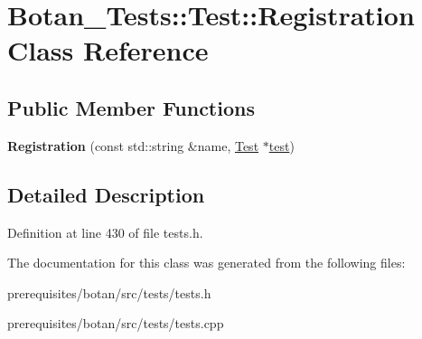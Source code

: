 \hypertarget{class_botan___tests_1_1_test_1_1_registration}{}\section{Botan\+\_\+\+Tests\+:\+:Test\+:\+:Registration Class Reference}
\label{class_botan___tests_1_1_test_1_1_registration}
\subsection*{Public Member Functions}
\begin{DoxyCompactItemize}
\item 
\mbox{\label{class_botan___tests_1_1_test_1_1_registration_ab631d332ec010cbedcefbd52cae0e8be}} 
{\bfseries Registration} (const std\+::string \&name, \mbox{\hyperlink{class_botan___tests_1_1_test}{Test}} $\ast$\mbox{\hyperlink{structtest}{test}})
\end{DoxyCompactItemize}


\subsection{Detailed Description}


Definition at line 430 of file tests.\+h.



The documentation for this class was generated from the following files\+:\begin{DoxyCompactItemize}
\item 
prerequisites/botan/src/tests/tests.\+h\item 
prerequisites/botan/src/tests/tests.\+cpp\end{DoxyCompactItemize}
